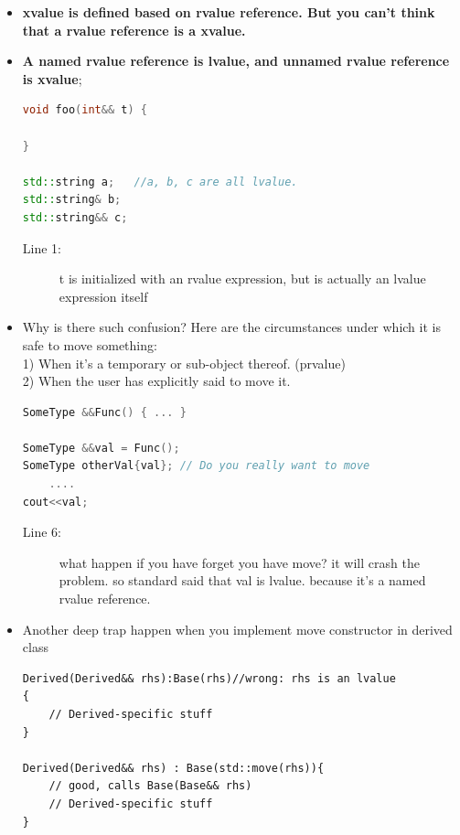 \documentclass[a4paper,11pt,twoside]{book}
\begin{document}
\begin{itemize}
	\item \textbf{xvalue is defined based on rvalue reference. But you can't think that a rvalue reference is a xvalue. }
	
	\item \textbf{A named rvalue reference is lvalue, and unnamed rvalue reference is xvalue};
	
\begin{lstlisting}[frame=single, language=c++,mathescape=true]
void foo(int&& t) {

}
	
std::string a;   //a, b, c are all lvalue.
std::string& b;
std::string&& c;
\end{lstlisting}
\begin{description}
	\item[Line 1:] t is initialized with an rvalue expression, but is actually an lvalue expression itself
\end{description}
	

	\item Why is there such confusion? Here are the circumstances under which it is safe to move something:\\
	1) When it's a temporary or sub-object thereof. (prvalue) \\
	2) When the user has explicitly said to move it.
\begin{lstlisting}[frame=single, language=c++]
SomeType &&Func() { ... }
	
SomeType &&val = Func();
SomeType otherVal{val}; // Do you really want to move 
	....
cout<<val; 
\end{lstlisting}
\begin{description}
	\item[Line 6:] what happen if you have forget you have move? it will crash the problem. so standard said that val is lvalue. because it's a named rvalue reference.
\end{description}
	
\item Another deep trap happen when you implement move constructor in derived class
\begin{lstlisting}[numbers=none]
Derived(Derived&& rhs):Base(rhs)//wrong: rhs is an lvalue
{
	// Derived-specific stuff
}
	
Derived(Derived&& rhs) : Base(std::move(rhs)){
	// good, calls Base(Base&& rhs)
	// Derived-specific stuff
}
\end{lstlisting}
	
\end{itemize}
\end{document}
